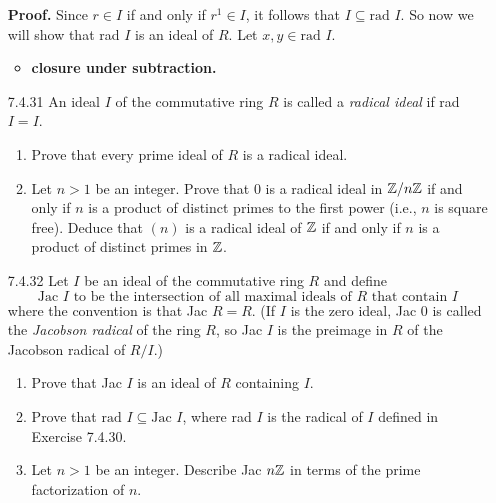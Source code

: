 \begin{enumerate}
      \textbf{Proof.} Since $r \in I$ if and only if $r^1 \in I$, it follows
      that $I \subseteq \text{rad }I$. So now we will show that rad $I$ is an
      ideal of $R$. Let $x, y \in \text{rad }I$.
      \begin{itemize}
         \item \textbf{closure under subtraction.}
      \end{itemize}
   \item[7.4.31]  An ideal $I$ of the commutative ring $R$ is called a
                  \textit{radical ideal} if rad $I = I$.
                  \begin{enumerate}
                     \item Prove that every prime ideal of $R$ is a radical
                           ideal.
                     \item Let $n > 1$ be an integer. Prove that 0 is a radical
                           ideal in $\mathbb{Z}/n\mathbb{Z}$ if and only if $n$ is a product of
                           distinct primes to the first power (i.e., $n$ is
                           square free). Deduce that $(n)$ is a radical ideal of
                           $\mathbb{Z}$ if and only if $n$ is a product of distinct
                           primes in $\mathbb{Z}$.
                  \end{enumerate}
   \item[7.4.32]  Let $I$ be an ideal of the commutative ring $R$ and define
                  $$\text{Jac $I$ to be the intersection of all maximal ideals
                     of $R$ that contain $I$}$$
                  where the convention is that Jac $R = R$. (If $I$ is the zero
                  ideal, Jac 0 is called the \textit{Jacobson radical} of the
                  ring $R$, so Jac $I$ is the preimage in $R$ of the Jacobson
                  radical of $R/I$.)
                  \begin{enumerate}
                     \item Prove that Jac $I$ is an ideal of $R$ containing $I$.
                     \item Prove that $\text{rad } I \subseteq \text{Jac }I$,
                           where rad $I$ is the radical of $I$ defined in
                           Exercise 7.4.30.
                     \item Let $n > 1$ be an integer. Describe Jac $n\mathbb{Z}$ in
                           terms of the prime factorization of $n$.

\end{enumerate}
\end{enumerate}
